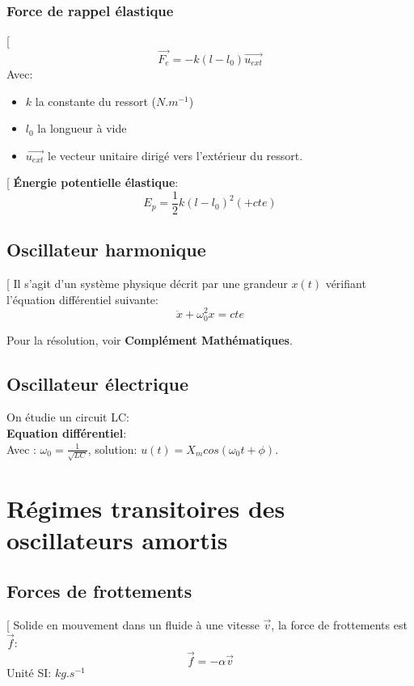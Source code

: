 \documentclass[12pt,hidelinks]{article}
\begin{document}
    \subsubsection{Force de rappel élastique}
     \begin{DashedDefinition}{}[
        \[ \overrightarrow{F_e} = -k(l-l_0) \overrightarrow{u_{ext}}\]
        Avec: 
        \begin{itemize}
            \item $k$ la constante du ressort ($N.m^{-1}$)
            \item $l_0$ la longueur à vide
            \item $\overrightarrow{u_{ext}}$ le vecteur unitaire dirigé vers l'extérieur du ressort.
        \end{itemize}
        \end{DashedDefinition}
        \begin{DashedDefinition}{}[
        \textbf{Énergie potentielle élastique}:
        \[E_p=\frac{1}{2} k (l-l_0)^2 (+cte)\]
        \end{DashedDefinition}
		\subsection{Oscillateur harmonique}
            \begin{DashedDefinition}{}[
            Il s'agit d'un système physique décrit par une grandeur $x(t)$ vérifiant l'équation différentiel suivante:
            \[ \ddot{x} + \omega_0^2 x = cte\]
            \end{DashedDefinition}
            Pour la résolution, voir \textbf{Complément Mathématiques}.
        \subsection{Oscillateur électrique}
            On étudie un circuit LC: \\
            \textbf{Equation différentiel}:  \\
            Avec : $\omega_0 = \frac{1}{\sqrt{LC}}$, solution: $u(t)=X_m cos(\omega_0 t + \phi)$.
\newpage
\section{Régimes transitoires des oscillateurs amortis}
\vspace{3cm}
	\subsection{Forces de frottements}
        \begin{DashedDefinition}{}[
            Solide en mouvement dans un fluide à une vitesse $\overrightarrow{v}$, la force de frottements est $\overrightarrow{f}$:
            \[\overrightarrow{f}=-\alpha \overrightarrow{v}\]
            Unité SI: \textbf{$kg.s^{-1}$}
        \end{DashedDefinition}
\end{document}
